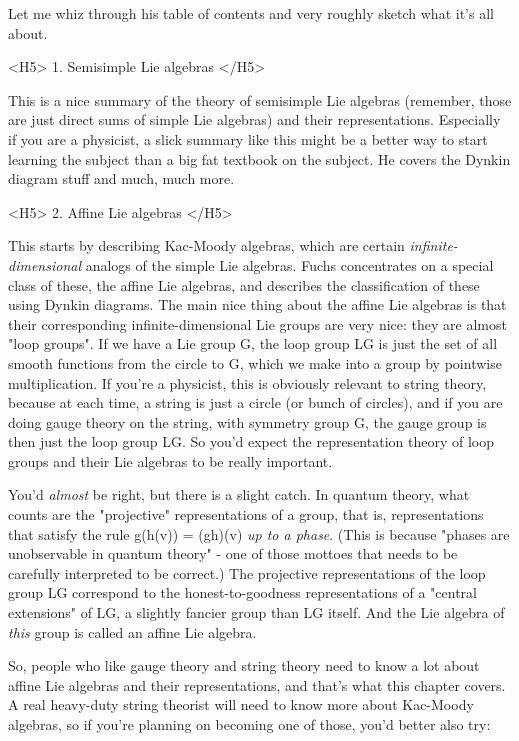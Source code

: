 Let me whiz through his table of contents and very roughly sketch what
it's all about.

<H5> 1.  Semisimple Lie algebras </H5>

This is a nice summary of the theory of semisimple Lie algebras
(remember, those are just direct sums of simple Lie algebras) and their
representations.  Especially if you are a physicist, a slick summary
like this might be a better way to start learning the subject than a big
fat textbook on the subject.  He covers the Dynkin diagram stuff and
much, much more.  

<H5> 2.  Affine Lie algebras </H5>

This starts by describing Kac-Moody algebras, which are certain
\emph{infinite-dimensional} analogs of the simple Lie algebras.  Fuchs
concentrates on a special class of these, the affine Lie algebras, and
describes the classification of these using Dynkin diagrams.  The main
nice thing about the affine Lie algebras is that their corresponding
infinite-dimensional Lie groups are very nice: they are almost "loop
groups".  If we have a Lie group G, the loop group LG is just the set of
all smooth functions from the circle to G, which we make into a group by
pointwise multiplication.  If you're a physicist, this is obviously
relevant to string theory, because at each time, a string is just a
circle (or bunch of circles), and if you are doing gauge theory on 
the string, with symmetry group G, the gauge group is then just the loop
group LG.  So you'd expect the representation theory of loop groups
and their Lie algebras to be really important.  

You'd \emph{almost} be right, but there is a slight catch.  In quantum
theory, what counts are the "projective" representations of a group,
that is, representations that satisfy the rule g(h(v)) = (gh)(v) 
\emph{up to a phase}.  (This is because "phases are unobservable in quantum
theory" - one of those mottoes that needs to be carefully interpreted
to be correct.)  The projective representations of the loop group LG
correspond to the honest-to-goodness representations of a "central
extensions" of LG, a slightly fancier group than LG itself.  And the
Lie algebra of \emph{this} group is called an affine Lie algebra.

So, people who like gauge theory and string theory need to know a
lot about affine Lie algebras and their representations, and that's
what this chapter covers.  A real heavy-duty string theorist will
need to know more about Kac-Moody algebras, so if you're planning
on becoming one of those, you'd better also try:

